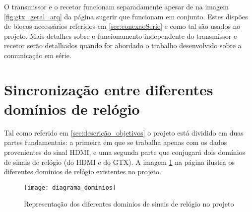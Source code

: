 O transmissor e o recetor funcionam separadamente apesar de na imagem \ref{fig:gtx_geral_arq} da página \pageref{fig:gtx_geral_arq} sugerir que funcionam em conjunto. Estes dispões de blocos necessários referidos em \ref{sec:conexaoSerie} e como tal são usados no projeto. Mais detalhes sobre o funcionamento independente do transmissor e recetor serão detalhados quando for abordado o trabalho desenvolvido sobre a comunicação em série.




\section{Sincronização entre diferentes domínios de relógio}

Tal como referido em \ref{sec:descrição_objetivos} o projeto está dividido em duas partes fundamentais: a primeira em que se trabalha apenas com os dados provenientes do sinal HDMI, e uma segunda parte que conjugará dois domínios de sinais de relógio (do HDMI e do GTX). A imagem \ref{fig:dominios_diferentes} na página \pageref{fig:dominios_diferentes} ilustra os diferentes dominios de relógio existentes no projeto.

\begin{figure}[h!]
	\begin{center}
		\leavevmode
		\texttt{[image: diagrama\_dominios]}
			\caption{Representação dos diferentes dominios de sinais de relógio no projeto}
		\label{fig:dominios_diferentes}
	\end{center}
\end{figure}

